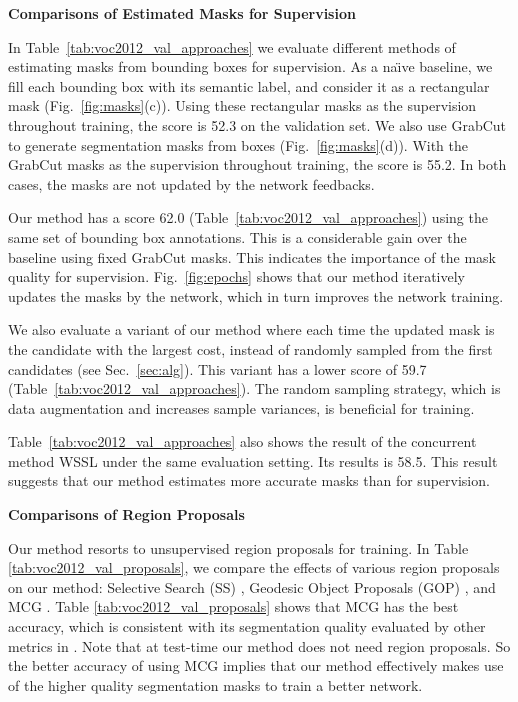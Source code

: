 \documentclass[10pt,twocolumn,letterpaper]{article}
\begin{document}
\vspace{8pt}
\noindent\textbf{Comparisons of Estimated Masks for Supervision}

In Table~\ref{tab:voc2012_val_approaches} we evaluate different methods of estimating masks from bounding boxes for supervision. As a na\"{\i}ve baseline, we fill each bounding box with its semantic label, and consider it as a rectangular mask (Fig.~\ref{fig:masks}(c)). Using these rectangular masks as the supervision throughout training, the score is 52.3 on the validation set. We also use GrabCut \cite{rother2004grabcut} to generate segmentation masks from boxes (Fig.~\ref{fig:masks}(d)). With the GrabCut masks as the supervision throughout training, the score is 55.2. In both cases, the masks are not updated by the network feedbacks.

Our method has a score 62.0 (Table~\ref{tab:voc2012_val_approaches}) using the same set of bounding box annotations. This is a considerable gain over the baseline using fixed GrabCut masks. This indicates the importance of the mask quality for supervision. Fig.~\ref{fig:epochs} shows that our method iteratively updates the masks by the network, which in turn improves the network training.

We also evaluate a variant of our method where each time the updated mask is the candidate with the largest cost, instead of randomly sampled from the first  candidates (see Sec.~\ref{sec:alg}). This variant has a lower score of 59.7 (Table~\ref{tab:voc2012_val_approaches}). The random sampling strategy, which is data augmentation and increases sample variances, is beneficial for training.

Table~\ref{tab:voc2012_val_approaches} also shows the result of the concurrent method WSSL \cite{Chen2015} under the same evaluation setting. Its results is 58.5. This result suggests that our method estimates more accurate masks than \cite{Chen2015} for supervision.


\vspace{8pt}
\noindent\textbf{Comparisons of Region Proposals}

Our method resorts to unsupervised region proposals for training.
In Table \ref{tab:voc2012_val_proposals}, we compare the effects of various region proposals on our method: Selective Search (SS) \cite{uijlings2013selective}, Geodesic Object Proposals (GOP) \cite{krahenbuhl2014geodesic}, and MCG \cite{arbelaez2014multiscale}.
Table \ref{tab:voc2012_val_proposals} shows that MCG \cite{arbelaez2014multiscale} has the best accuracy, which is consistent with its segmentation quality evaluated by other metrics in \cite{arbelaez2014multiscale}. Note that at test-time our method does not need region proposals. So the better accuracy of using MCG implies that
our method effectively makes use of the higher quality segmentation masks to train a better network.
\end{document}
